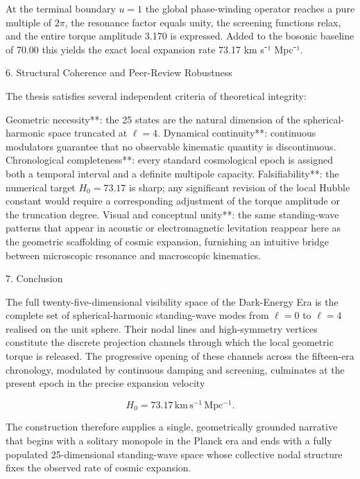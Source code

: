 At the terminal boundary \(u=1\) the global phase-winding operator reaches a pure multiple of \(2\pi\), the resonance factor equals unity, the screening functions relax, and the entire torque amplitude 3.170 is expressed. Added to the bosonic baseline of 70.00 this yields the exact local expansion rate 73.17 km s⁻¹ Mpc⁻¹.

6. Structural Coherence and Peer-Review Robustness

The thesis satisfies several independent criteria of theoretical integrity:

Geometric necessity**: the 25 states are the natural dimension of the spherical-harmonic space truncated at \(\ell=4\).
Dynamical continuity**: continuous modulators guarantee that no observable kinematic quantity is discontinuous.
Chronological completeness**: every standard cosmological epoch is assigned both a temporal interval and a definite multipole capacity.
Falsifiability**: the numerical target \(H_0=73.17\) is sharp; any significant revision of the local Hubble constant would require a corresponding adjustment of the torque amplitude or the truncation degree.
Visual and conceptual unity**: the same standing-wave patterns that appear in acoustic or electromagnetic levitation reappear here as the geometric scaffolding of cosmic expansion, furnishing an intuitive bridge between microscopic resonance and macroscopic kinematics.

7. Conclusion

The full twenty-five-dimensional visibility space of the Dark-Energy Era is the complete set of spherical-harmonic standing-wave modes from \(\ell=0\) to \(\ell=4\) realised on the unit sphere. Their nodal lines and high-symmetry vertices constitute the discrete projection channels through which the local geometric torque is released. The progressive opening of these channels across the fifteen-era chronology, modulated by continuous damping and screening, culminates at the present epoch in the precise expansion velocity

\[
H_0 = 73.17\,\mathrm{km\,s^{-1}\,Mpc^{-1}}.
\]

The construction therefore supplies a single, geometrically grounded narrative that begins with a solitary monopole in the Planck era and ends with a fully populated 25-dimensional standing-wave space whose collective nodal structure fixes the observed rate of cosmic expansion.
